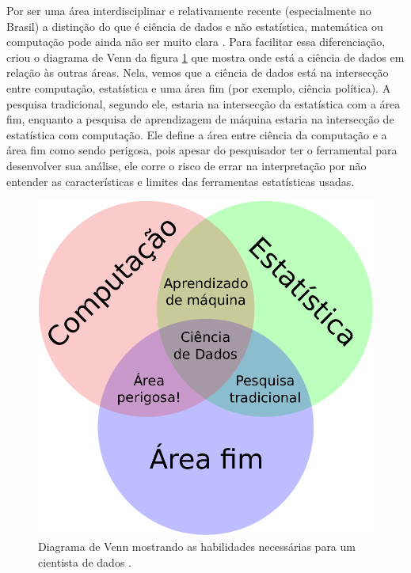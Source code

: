 \documentclass[a4paper,titlepage]{ppgi}\usepackage[]{graphicx}\usepackage[]{color}
\begin{document}
Por ser uma área interdisciplinar e relativamente recente (especialmente no
Brasil) a distinção do que é ciência de dados e não estatística, matemática ou
computação pode ainda não ser muito clara \cite{Porto2014}. Para facilitar essa
diferenciação,  criou o diagrama de Venn da figura
\ref{fig:ciencia-de-dados-venn} que mostra onde está a ciência de dados em
relação às outras áreas. Nela, vemos que a ciência de dados está na intersecção
entre computação, estatística e uma área fim (por exemplo, ciência política). A
pesquisa tradicional, segundo ele, estaria na intersecção da estatística com a
área fim, enquanto a pesquisa de aprendizagem de máquina estaria na intersecção
de estatística com computação. Ele define a área entre ciência da computação e
a área fim como sendo perigosa, pois apesar do pesquisador ter o ferramental
para desenvolver sua análise, ele corre o risco de errar na interpretação por
não entender as características e limites das ferramentas estatísticas usadas.

\begin{figure}[h]
\includegraphics{ciencia-de-dados-diagrama-venn}
\caption{Diagrama de Venn mostrando as habilidades necessárias para um
cientista de dados \cite{Conway2013}.}
\label{fig:ciencia-de-dados-venn}
\end{figure}
\end{document}
